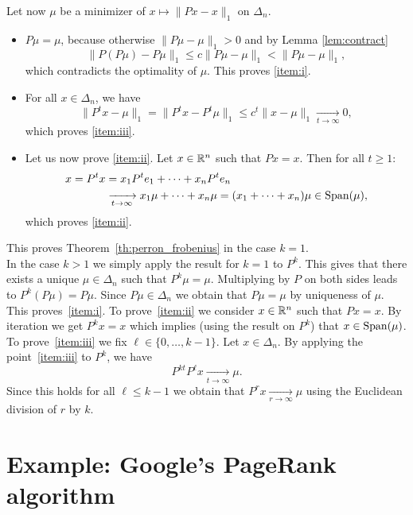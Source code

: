 \documentclass[11pt,nocut]{article}
\begin{document}
Let now $\mu$ be a minimizer of $x \mapsto \|Px-x\|_1$ on $\Delta_n$.
\begin{itemize}
	\item $P\mu = \mu$, because otherwise $\|P \mu - \mu\|_1 > 0$ and by Lemma \ref{lem:contract}
		$$
		\| P (P\mu) - P\mu \|_1 \leq c \|P\mu - \mu\|_1 < \|P \mu - \mu\|_1,
		$$
		which contradicts the optimality of $\mu$. This proves \ref{item:i}.
	\item For all $x \in \Delta_n$, we have
		$$
		\|P^t x - \mu \|_1 = \| P^t x - P^t \mu \|_1 \leq c^t \|x-\mu\|_1 \xrightarrow[t\to \infty]{} 0,
		$$
		which proves \ref{item:iii}.
	\item Let us now prove \ref{item:ii}. Let $x \in \mathbb{R}^n$ such that $Px = x$. Then for all $t \geq 1$:
		\begin{align}
		x = P^t x
		&= x_1 P^t e_1 + \dots + x_n P^t e_n
		\\
		&\xrightarrow[t \to \infty]{} x_1 \mu + \dots + x_n \mu = (x_1 + \dots + x_n) \mu \in {{\rm Span}}(\mu),
		\end{align}
		which proves \ref{item:ii}.
\end{itemize}
This proves Theorem~\ref{th:perron_frobenius} in the case $k=1$.
\\

In the case $k > 1$ we simply apply the result for $k=1$ to $P^k$.
This gives that there exists a unique $\mu \in \Delta_n$ such that $P^k \mu = \mu$. Multiplying by $P$ on both sides leads to $P^k (P\mu) = P\mu$. 
Since $P\mu \in \Delta_n$ we obtain that $P\mu = \mu$ by uniqueness of $\mu$. This proves~\ref{item:i}. To prove~\ref{item:ii} we consider $x \in \mathbb{R}^n$ such that $P x = x$. By iteration we get $P^k x = x$ which implies (using the result on $P^k$) that $x \in {{\rm Span}}(\mu)$.
To prove~\ref{item:iii} we fix $\ell \in \{0, \dots, k-1\}$. Let $x \in \Delta_n$. By applying the point~\ref{item:iii} to $P^k$, we have 
$$
P^{kt} P^{\ell} x \xrightarrow[t \to \infty]{} \mu.
$$
Since this holds for all $\ell \leq k-1$ we obtain that $P^r x \xrightarrow[r \to \infty]{} \mu$ using the Euclidean division of $r$ by $k$.

\section{Example: Google's PageRank algorithm}
\end{document}
